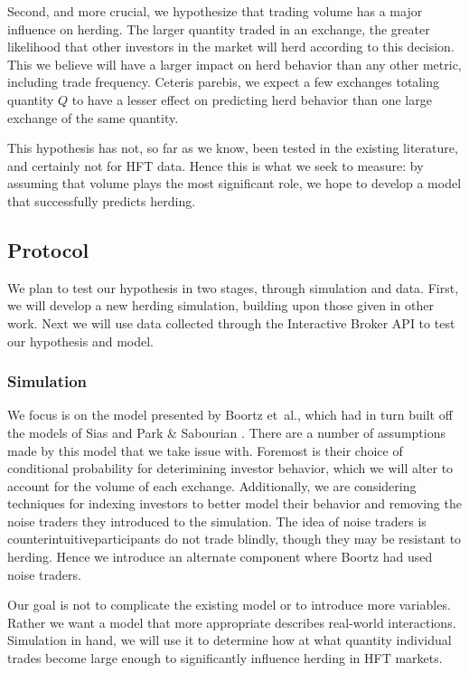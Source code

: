 \documentclass{article}
\begin{document}
Second, and more crucial, we hypothesize that trading volume has a major influence on herding. 
The larger quantity traded in an exchange, the greater likelihood that other investors in the market will herd according to this decision.
This we believe will have a larger impact on herd behavior than any other metric, including trade frequency.
Ceteris parebis, we expect a few exchanges totaling quantity $Q$ to have a lesser effect on predicting herd behavior than one large exchange of the same quantity.

This hypothesis has not, so far as we know, been tested in the existing literature, and certainly not for HFT data.
Hence this is what we seek to measure: by assuming that volume plays the most significant role, we hope to develop a model that successfully predicts herding.

\subsection*{Protocol}
We plan to test our hypothesis in two stages, through simulation and data.
First, we will develop a new herding simulation, building upon those given in other work.
Next we will use data collected through the Interactive Broker API to test our hypothesis and model. 

\subsubsection*{Simulation}
We focus is on the model presented by Boortz et~al., which had in turn built off the models of Sias and Park \& Sabourian \cite{boortz,sias2004institutional,park2011herding}.
There are a number of assumptions made by this model that we take issue with. 
Foremost is their choice of conditional probability for deterimining investor behavior, which we will alter to account for the volume of each exchange.
Additionally, we are considering techniques for indexing investors to better model their behavior and removing the noise traders they introduced to the simulation.
The idea of noise traders is counterintuitive\textemdash participants do not trade blindly, though they may be resistant to herding.
Hence we introduce an alternate component where Boortz had used noise traders. 

Our goal is not to complicate the existing model or to introduce more variables.
Rather we want a model that more appropriate describes real-world interactions. 
Simulation in hand, we will use it to determine how at what quantity individual trades become large enough to significantly influence herding in HFT markets.
\end{document}
